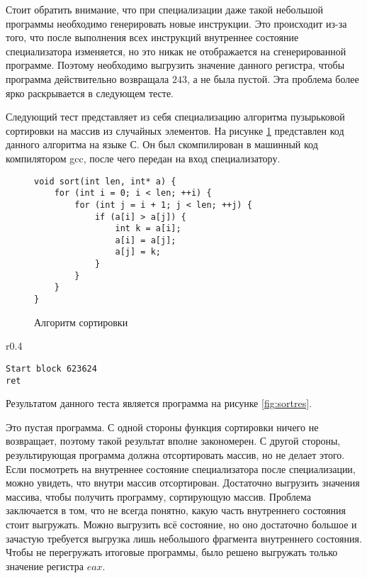 \documentclass{spbau-diploma}
\begin{document}
Стоит обратить внимание, что при специализации даже такой небольшой программы необходимо генерировать новые инструкции. Это происходит из-за того, что после выполнения всех инструкций внутреннее состояние специализатора изменяется, но это никак не отображается на сгенерированной программе. Поэтому необходимо выгрузить значение данного регистра, чтобы программа действительно возвращала $243$, а не была пустой. Эта проблема более ярко раскрывается в следующем тесте.

Следующий тест представляет из себя специализацию алгоритма пузырьковой сортировки на массив из случайных элементов. На рисунке \ref{fig:sort} представлен код данного алгоритма на языке С. Он был скомпилирован в машинный код компилятором gcc, после чего передан на вход специализатору.
\begin{figure}[h]
\begin{lstlisting}[xleftmargin = 20pt]
void sort(int len, int* a) {
    for (int i = 0; i < len; ++i) {
        for (int j = i + 1; j < len; ++j) {
            if (a[i] > a[j]) {
                int k = a[i];
                a[i] = a[j];
                a[j] = k;
            }
        }
    }
}
\end{lstlisting}
\caption{ Алгоритм сортировки}
\label{fig:sort}
\end{figure}
\begin{wrapfigure}{r}{0.4\textwidth}
\begin{lstlisting}[xleftmargin = 20pt]
Start block 623624
ret
\end{lstlisting}
\caption{ Результат специализации}
\label{fig:sortres}
\end{wrapfigure}
Результатом данного теста является программа на рисунке \ref{fig:sortres}.

Это пустая программа. С одной стороны функция сортировки ничего не возвращает, поэтому такой результат вполне закономерен. С другой стороны, результирующая программа должна отсортировать массив, но не делает этого. Если посмотреть на внутреннее состояние специализатора после специализации, можно увидеть, что внутри массив отсортирован. Достаточно выгрузить значения массива, чтобы получить программу, сортирующую массив. Проблема заключается в том, что не всегда понятно, какую часть внутреннего состояния стоит выгружать. Можно выгрузить всё состояние, но оно достаточно большое и зачастую требуется выгрузка лишь небольшого фрагмента внутреннего состояния. Чтобы не перегружать итоговые программы, было решено выгружать только значение регистра $eax$.
\end{document}

